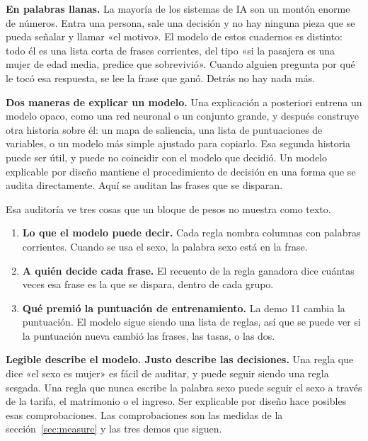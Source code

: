 \documentclass[11pt]{article}
\begin{document}
\begin{plainwords}
\textbf{En palabras llanas.} La mayoría de los sistemas de IA son un montón enorme de números. Entra una persona, sale una decisión y no hay ninguna pieza que se pueda señalar y llamar «el motivo». El modelo de estos cuadernos es distinto: todo él es una lista corta de frases corrientes, del tipo «si la pasajera es una mujer de edad media, predice que sobrevivió». Cuando alguien pregunta por qué le tocó esa respuesta, se lee la frase que ganó. Detrás no hay nada más.
\end{plainwords}

\begin{idea}
\textbf{Dos maneras de explicar un modelo.} Una explicación a posteriori entrena un modelo opaco, como una red neuronal o un conjunto grande, y después construye otra historia sobre él: un mapa de saliencia, una lista de puntuaciones de variables, o un modelo más simple ajustado para copiarlo. Esa segunda historia puede ser útil, y puede no coincidir con el modelo que decidió. Un modelo explicable por diseño mantiene el procedimiento de decisión en una forma que se audita directamente. Aquí se auditan las frases que se disparan.
\end{idea}

Esa auditoría ve tres cosas que un bloque de pesos no muestra como texto.

\begin{enumerate}
  \item \textbf{Lo que el modelo puede decir.} Cada regla nombra columnas con palabras corrientes. Cuando se usa el sexo, la palabra sexo está en la frase.
  \item \textbf{A quién decide cada frase.} El recuento de la regla ganadora dice cuántas veces esa frase es la que se dispara, dentro de cada grupo.
  \item \textbf{Qué premió la puntuación de entrenamiento.} La demo 11 cambia la puntuación. El modelo sigue siendo una lista de reglas, así que se puede ver si la puntuación nueva cambió las frases, las tasas, o las dos.
\end{enumerate}

\begin{careful}
\textbf{Legible describe el modelo. Justo describe las decisiones.} Una regla que dice «el sexo es mujer» es fácil de auditar, y puede seguir siendo una regla sesgada. Una regla que nunca escribe la palabra sexo puede seguir el sexo a través de la tarifa, el matrimonio o el ingreso. Ser explicable por diseño hace posibles esas comprobaciones. Las comprobaciones son las medidas de la sección~\ref{sec:measure} y las tres demos que siguen.
\end{careful}
\end{document}
